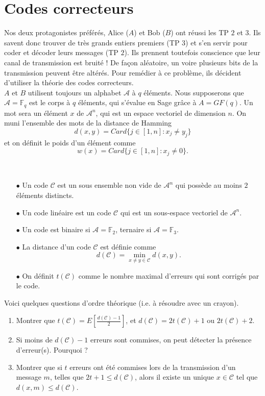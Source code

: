 \section{Codes correcteurs}


Nos deux protagonistes préférés, Alice ($A$) et Bob ($B$) ont réussi les TP $2$ et $3$. Ils savent donc trouver de très grands entiers premiers (TP $3$) et s'en servir pour coder et décoder leurs messages (TP $2$). Ils prennent toutefois conscience que leur canal de transmission est bruité ! De façon aléatoire, un voire plusieurs bits de la transmission peuvent être altérés. Pour remédier à ce problème, ils décident d'utiliser la théorie des codes correcteurs.\\

$A$ et $B$ utilisent toujours un alphabet $\mathcal A$ à $q$ éléments. Nous supposerons que $\mathcal A = \mathbb F_q $ est le corps à $q$ éléments, qui s'évalue en Sage grâce à $A=GF(q)$. Un mot sera un élément $x$ de $\mathcal A^n$, qui est un espace vectoriel de dimension $n$. On muni l'ensemble des mots de la distance de Hamming
\[d(x,y)=Card \{j\in [1,n] : x_j\neq y_j\}\]
et on définit le poids d'un élément comme
\[w(x)=Card \{j\in [1,n] : x_j\neq 0\}.\]
\begin{definition}\
\begin{itemize}
\item[$\bullet$] Un code $\mathcal C$ est un sous ensemble non vide de $\mathcal A^n$ qui possède au moins $2$ éléments distincts.
\item[$\bullet$] Un code linéaire est un code $\mathcal C$ qui est un sous-espace vectoriel de $\mathcal A ^n$.
\item[$\bullet$] Un code est binaire si $\mathcal A=\mathbb F_2$, ternaire si $\mathcal A = \mathbb F_3$.
\item[$\bullet$] La distance d'un code $\mathcal C$ est définie comme \[d(\mathcal C)=\min_{x\neq y \in \mathcal C} d(x,y).\]
\item[$\bullet$] On définit $t(\mathcal C)$ comme le nombre maximal d'erreurs qui sont corrigés par le code.
\end{itemize}
\end{definition}

Voici quelques questions d'ordre théorique (i.e. à résoudre avec un crayon).
\begin{enumerate}
\item Montrer que $t(\mathcal C)=E[\frac{d(\mathcal C)-1}{2}]$, et $d(\mathcal C)=2t(\mathcal C)+1$ ou $2t(\mathcal C)+2$.
\item Si moins de $d(\mathcal C)-1$ erreurs sont commises, on peut détecter la présence d'erreur(s). Pourquoi ?
\item Montrer que si $t$ erreurs ont été commises lors de la transmission d'un message $m$, telles que $2t+1\leq d(\mathcal C)$, alors il existe un unique $x\in \mathcal C$ tel que $d(x,m)\leq d(\mathcal C)$.\\
\end{enumerate}

